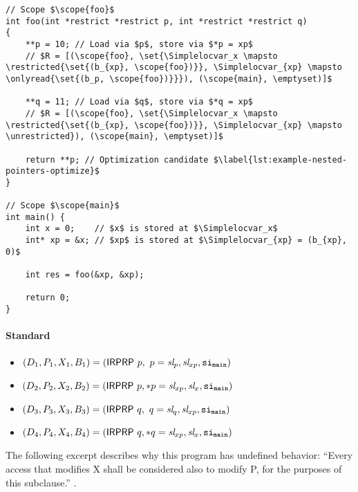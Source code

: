 \begin{code}
\begin{verbatim}
// Scope $\scope{foo}$
int foo(int *restrict *restrict p, int *restrict *restrict q)
{
    **p = 10; // Load via $p$, store via $*p = xp$ 
    // $R = [(\scope{foo}, \set{\Simplelocvar_x \mapsto \restricted{\set{(b_{xp}, \scope{foo})}}, \Simplelocvar_{xp} \mapsto \onlyread{\set{(b_p, \scope{foo})}}}), (\scope{main}, \emptyset)]$
    
    **q = 11; // Load via $q$, store via $*q = xp$
    // $R = [(\scope{foo}, \set{\Simplelocvar_x \mapsto \restricted{\set{(b_{xp}, \scope{foo})}}, \Simplelocvar_{xp} \mapsto \unrestricted}), (\scope{main}, \emptyset)]$
    
    return **p; // Optimization candidate $\label{lst:example-nested-pointers-optimize}$
}

// Scope $\scope{main}$
int main() {
    int x = 0;    // $x$ is stored at $\Simplelocvar_x$
    int* xp = &x; // $xp$ is stored at $\Simplelocvar_{xp} = (b_{xp}, 0)$
    
    int res = foo(&xp, &xp);

    return 0;
}
\end{verbatim}
\caption{Undetected undefined behavior through nested restrict pointers (TLU)}
\label{lst:example-nested-pointers} %
\end{code}
\leavevmode

\newpage

\paragraph{Standard} 
\begin{itemize}
    \itemsep0em
    \item $(D_1, P_1, X_1, B_1) = (\irprp \ p,  \ p = \Simplelocvar_p, \Simplelocvar_{xp}, \scope{main})$
    \item $(D_2, P_2, X_2, B_2) = (\mathsf{IRPRP} \ p, *p = \textit{sl}_{xp}, \textit{sl}_x, \mathtt{si}_\mathtt{main})$
    \item $(D_3, P_3, X_3, B_3) = (\irprp \ q,  \ q = \Simplelocvar_q, \Simplelocvar_{xp}, \scope{main})$
    \item $(D_4, P_4, X_4, B_4) = (\mathsf{IRPRP} \ q, *q = \textit{sl}_{xp}, \textit{sl}_x, \mathtt{si}_\mathtt{main})$
\end{itemize}

The following excerpt describes why this program has undefined behavior:
``Every access that modifies X shall be considered also to modify P, for the purposes of this subclause.'' \cite[6.7.3.1, p4]{ISO:2018:III}.

